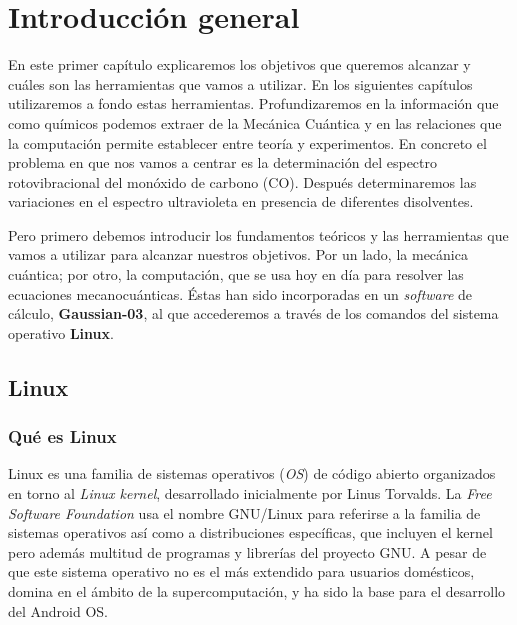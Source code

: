 \documentclass{tufte-book}
\begin{document}



\chapter[introduccion]{Introducción general}
En este primer capítulo explicaremos los objetivos que queremos
alcanzar y cuáles son las herramientas que vamos a utilizar. En 
los siguientes capítulos utilizaremos a fondo estas herramientas.
Profundizaremos en la información que como químicos podemos extraer
de la Mecánica Cuántica y en las relaciones que la computación 
permite establecer entre teoría y experimentos. En concreto el
problema en que nos vamos a centrar es la determinación del espectro
rotovibracional del monóxido de carbono (CO). Después determinaremos
las variaciones en el espectro ultravioleta en presencia de 
diferentes disolventes.

Pero primero debemos introducir los fundamentos teóricos
y las herramientas que vamos a utilizar para alcanzar nuestros 
objetivos. Por un lado, la mecánica cuántica; por otro, la
computación, que se usa hoy en día para resolver las ecuaciones 
mecanocuánticas. Éstas han sido incorporadas en un \textit{software}
de cálculo, \textbf{Gaussian-03}, al que accederemos a través de 
los comandos del sistema operativo \textbf{Linux}.

\section{Linux}
\subsection{Qué es Linux}
Linux es una familia de sistemas operativos (\textit{OS}) de código 
abierto organizados en torno al \textit{Linux kernel}, desarrollado
inicialmente por Linus Torvalds. La \textit{Free Software Foundation} 
usa el nombre GNU/Linux para referirse a la familia de sistemas 
operativos así como a distribuciones específicas, que incluyen el 
kernel pero además multitud de programas y librerías del proyecto
GNU. A pesar de que este sistema operativo no es el más extendido
para usuarios domésticos, domina en el ámbito de la supercomputación,
y ha sido la base para el desarrollo del Android OS.
\end{document}
